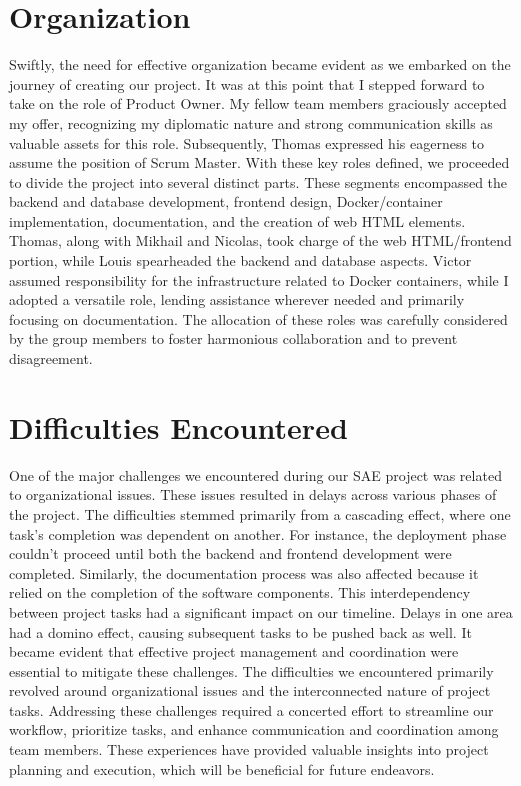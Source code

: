 \documentclass[12pt, a4paper]{article}
\begin{document}
\newpage
\section{Organization}
Swiftly, the need for effective organization
became evident as we embarked on the journey of
creating our project. It was at this point that I
stepped forward to take on the role of Product
Owner. My fellow team members graciously accepted
my offer, recognizing my diplomatic nature and
strong communication skills as valuable assets
for this role. Subsequently, Thomas expressed
his eagerness to assume the position of Scrum
Master. With these key roles defined, we proceeded
to divide the project into several distinct parts.
These segments encompassed the backend and database
development, frontend design, Docker/container
implementation, documentation, and the creation
of web HTML elements. Thomas, along with Mikhail
and Nicolas, took charge of the web HTML/frontend
portion, while Louis spearheaded the backend and
database aspects. Victor assumed responsibility
for the infrastructure related to Docker containers,
while I adopted a versatile role, lending assistance
wherever needed and primarily focusing on documentation.
The allocation of these roles was carefully considered
by the group members to foster harmonious collaboration
and to prevent disagreement.

\section{Difficulties Encountered}
One of the major challenges we encountered during our SAE
project was related to organizational issues. These issues
resulted in delays across various phases of the project.
The difficulties stemmed primarily from a cascading effect,
where one task's completion was dependent on another. 
For instance, the deployment phase couldn't proceed until
both the backend and frontend development were completed.
Similarly, the documentation process was also affected because
it relied on the completion of the software components.
This interdependency between project tasks had a significant
impact on our timeline. Delays in one area had a domino effect,
causing subsequent tasks to be pushed back as well. It became
evident that effective project management and coordination were
essential to mitigate these challenges.
The difficulties we encountered primarily revolved
around organizational issues and the interconnected nature of project
tasks. Addressing these challenges required a concerted effort to
streamline our workflow, prioritize tasks, and enhance communication
and coordination among team members. These experiences have provided
valuable insights into project planning and execution, which will be
beneficial for future endeavors.
\end{document}
